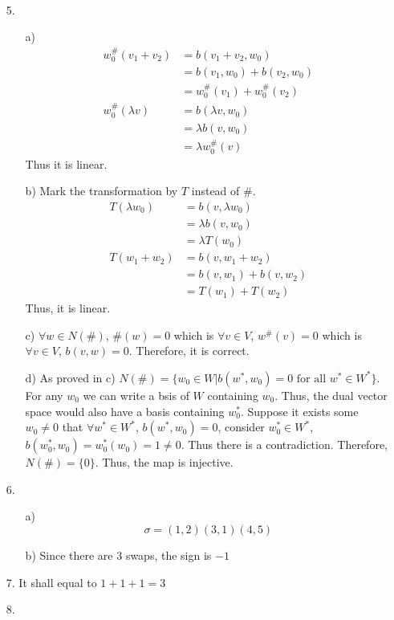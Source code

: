 \documentclass{article}
\begin{document}
\begin{itemize}
\begin{itemize}
\begin{align*}
        \end{align*}
    \end{itemize}
    \item [5.]
    \begin{itemize}
        \item [a)]
        \begin{align*}
            w_0^\#(v_1+v_2) &= b(v_1+v_2,w_0)\\
            &= b(v_1,w_0)+b(v_2,w_0)\\
            &= w_0^\#(v_1)+w_0^\#(v_2)\\
            w_0^\#(\lambda v)&= b(\lambda v,w_0)\\
            &= \lambda b(v,w_0)\\
            &=\lambda w_0^\#(v)
        \end{align*}
        Thus it is linear.
        \item [b)]
        Mark the transformation by \(T\) instead of \(\#\).\\
        \begin{align*}
            T(\lambda w_0)&=b(v,\lambda w_0)\\
            &=\lambda b(v,w_0)\\
            &=\lambda T(w_0)\\
            T(w_1+w_2)&=b(v,w_1+w_2)\\
            &=b(v,w_1)+b(v,w_2)\\
            &=T(w_1)+T(w_2)
        \end{align*}
        Thus, it is linear.
        \item [c)]
        \(\forall w\in N(\#)\), \(\#(w)=0\) which is \(\forall v\in V\), \(w^\#(v)=0\) which is \(\forall v \in V\), \(b(v,w)=0\). Therefore, it is correct.
        \item [d)]
        As proved in c) \(N(\#)=\{w_0\in W|b(w^*,w_0)=0 \text{ for all } w^*\in W^*\}\). For any \(w_0\) we can write a bsis of \(W\) containing \(w_0\). Thus, the dual vector space would also have a basis containing \(w_0^*\).
        Suppose it exists some \(w_0\neq 0\) that \(\forall w^*\in W^*\), \(b(w^*,w_0)=0\), consider \(w_0^*\in W^*\), \(b(w_0^*,w_0)=w_0^*(w_0)=1\neq 0\). Thus there is a contradiction. Therefore, \(N(\#)=\{0\}\). Thus, the map is injective.
    \end{itemize}
    \item [6.]
    \begin{itemize}
        \item [a)] \[\sigma = (1,2)(3,1)(4,5)\]
        \item [b)] Since there are 3 swaps, the sign is \(-1\)
    \end{itemize}
    \item [7.] It shall equal to \(1+1+1=3\)
    \item [8.] 
\end{itemize}
\end{document}
